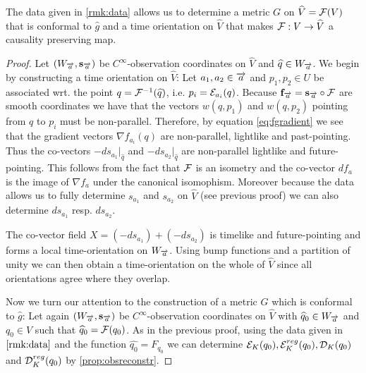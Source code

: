 \begin{lemma}\label{lem:constructmetric}
The data given in \ref{rmk:data} allows us to determine a metric $G$ on $\widehat{V}=\F(V)$ that is conformal to $\widehat{g}$ and a time orientation on $\widehat{V}$ that makes $\F:V\to \widehat{V}$ a causality preserving map.
\end{lemma}
\begin{proof}
    Let $(W_\aa,\mathbf{s}_\aa)$ be $C^\infty$-observation coordinates on $\widehat{V}$ and $\widehat{q}\in W_\aa$.
    We begin by constructing a time orientation on $\widehat{V}$:
    Let $a_1, a_2\in \aa$ and $p_1,p_2\in U$ be associated wrt. the point $q=\F^{-1}(\widehat{q})$, i.e. $p_i=\mc{E}_{a_i}(q)$.
    Because $\mathbf{f}_\aa = \mathbf{s}_\aa \circ \F$ are smooth coordinates we have that the vectors $w(q,p_1)$ and $w(q,p_2)$ pointing from $q$ to $p_i$ must be non-parallel. Therefore, by equation \ref{eq:fgradient} we see that the gradient vectors $\nabla f_{a_i}(q)$ are non-parallel, lightlike and past-pointing. 
    Thus the co-vectors $-ds_{a_1}\rvert_{\widehat{q}}$ and $-ds_{a_2}\rvert_{\widehat{q}}$ are non-parallel lightlike and future-pointing. This follows from the fact that $\F$ is an isometry and the co-vector $df_a$ is the image of  $\nabla f_a$ under the canonical isomophism. Moreover because the data allows us to fully determine $s_{a_1}$ and $s_{a_2}$ on $\widehat{V}$ (see previous proof) we can also determine $ds_{a_1}$ resp. $ds_{a_2}$.
    
    The co-vector field $X=(-ds_{a_1})+(-ds_{a_2})$ is timelike and future-pointing and forms a local time-orientation on $W_\aa$. Using bump functions and a partition of unity we can then obtain a time-orientation on the whole of $\widehat{V}$ since all orientations agree where they overlap.
    
    Now we turn our attention to the construction of a metric $G$ which is conformal to $\widehat{g}$: Let again $(W_\aa,\mathbf{s}_\aa)$ be $C^\infty$-observation coordinates on $\widehat{V}$ with $\widehat{q}_0\in W_\aa$ and $q_0\in V$ such that $\widehat{q}_0=\F(q_0)$. As in the previous proof, using the data given in $\ref{rmk:data}$ and the function $\widehat{q_0}=F_{q_0}$ we can determine $\ee(q_0), \er(q_0), \mc{D}_K(q_0)$ and $\mc{D}^{reg}_K(q_0)$ by \ref{prop:obsreconstr}.
    

\end{proof}
